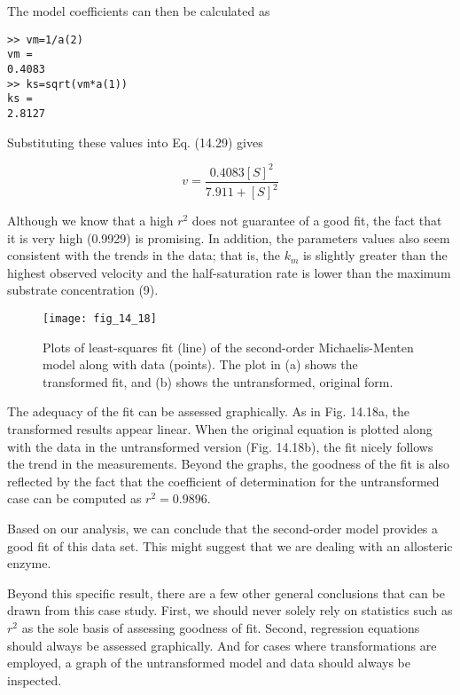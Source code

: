 \documentclass[../main.tex]{subfiles}
\begin{document}
\noindent The model coefficients can then be calculated as

\begin{lstlisting}[numbers=none] 
>> vm=1/a(2)
vm =
0.4083
>> ks=sqrt(vm*a(1))
ks =
2.8127
\end{lstlisting}

\noindent Substituting these values into Eq. (14.29) gives

\begin{equation}
	v = \frac{0.4083[S]^2}{7.911 + [S]^2}
\end{equation}

Although we know that a high $r^2$ does not guarantee of a good fit, the fact that it is very high (0.9929) is promising. In addition, the parameters values also seem consistent with the trends in the data; that is, the $k_m$ is slightly greater than the highest observed velocity and the half-saturation rate is lower than the maximum substrate concentration (9).

\begin{figure}[H] 
	\centering
	\texttt{[image: fig\_14\_18]}
	\caption{\textsf{Plots of least-squares fit (line) of the second-order Michaelis-Menten model along with data (points). The plot in (a) shows the transformed fit, and (b) shows the untransformed, original form.}}
	\label{fig:fig_14_18}
\end{figure}

The adequacy of the fit can be assessed graphically. As in Fig. 14.18a, the transformed results appear linear. When the original equation is plotted along with the data in the untransformed version (Fig. 14.18b), the fit nicely follows the trend in the measurements. Beyond the graphs, the goodness of the fit is also reflected by the fact that the coefficient of determination for the untransformed case can be computed as $r^2 = 0.9896$.

Based on our analysis, we can conclude that the second-order model provides a good fit of this data set. This might suggest that we are dealing with an allosteric enzyme. 

Beyond this specific result, there are a few other general conclusions that can be drawn from this case study. First, we should never solely rely on statistics such as $r^2$ as the sole basis of assessing goodness of fit. Second, regression equations should always be assessed graphically. And for cases where transformations are employed, a graph of the untransformed model and data should always be inspected. 
\end{document}

